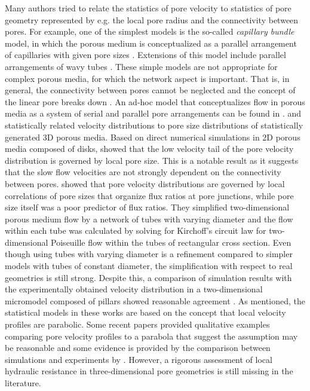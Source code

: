 \documentclass[draft]{agujournal2019}
\begin{document}
Many authors tried to relate the statistics of pore velocity to statistics of pore geometry represented by e.g. the local pore radius and the connectivity between pores. For example, one of the simplest models is the so-called \emph{capillary bundle} model, in which the porous medium is conceptualized as a parallel arrangement of capillaries with given pore sizes \cite{scheidegger_physics_1974}. Extensions of this model include parallel arrangements of wavy tubes \cite{le_borgne_effective_2011}. These simple models are not appropriate for complex porous media, for which the network aspect is important. That is, in general, the connectivity between pores cannot be neglected and the concept of the linear pore breaks down \cite{dentz_mechanisms_2018}. An ad-hoc model that conceptualizes flow in porous media as a system of serial and parallel pore arrangements can be found in .  and  statistically related velocity distributions to pore size distributions of statistically generated 3D porous media. Based on direct numerical simulations in 2D porous media composed of disks,  showed that the low velocity tail of the pore velocity distribution is governed by local pore size. This is a notable result as it suggests that the slow flow velocities are not strongly dependent on the connectivity between pores.  showed that pore velocity distributions are governed by local correlations of pore sizes that organize flux ratios at pore junctions, while pore size itself was a poor predictor of flux ratios. They simplified two-dimensional porous medium flow by a network of tubes with varying diameter and the flow within each tube was calculated by solving for Kirchoff’s circuit law for two-dimensional Poiseuille flow within the tubes of rectangular cross section. Even though using tubes with varying diameter is a refinement compared to simpler models with tubes of constant diameter, the simplification with respect to real geometries is still strong. Despite this, a comparison of simulation results with the experimentally obtained velocity distribution in a two-dimensional micromodel composed of pillars showed reasonable agreement \cite{alim_local_2017}. As mentioned, the statistical models in these works are based on the concept that local velocity profiles are parabolic. Some recent papers provided qualitative examples comparing pore velocity profiles to a parabola that suggest the assumption may be reasonable \cite{de_anna_prediction_2017,dentz_mechanisms_2018} and some evidence is provided by the comparison between simulations and experiments by . However, a rigorous assessment of local hydraulic resistance in three-dimensional pore geometries is still missing in the literature. 
\end{document}
